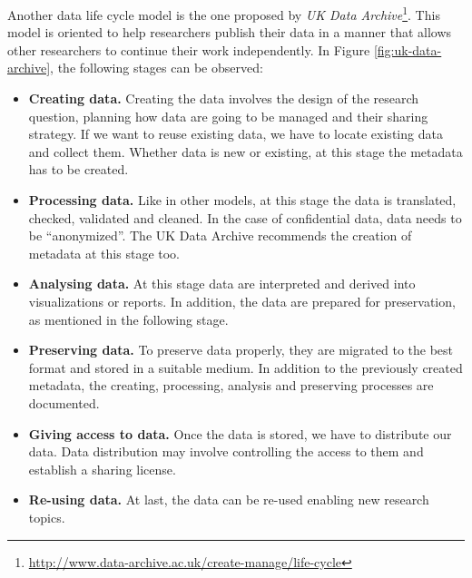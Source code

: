 Another data life cycle model is the one proposed by \textit{UK Data Archive}\footnote{\url{http://www.data-archive.ac.uk/create-manage/life-cycle}}. This model is oriented to help researchers publish their data in a manner that allows other researchers to continue their work independently. In Figure \ref{fig:uk-data-archive}, the following stages can be observed:
\begin{itemize}
    \item \textbf{Creating data.} Creating the data involves the design of the research question, planning how data are going to be managed and their sharing strategy. If we want to reuse existing data, we have to locate existing data and collect them. Whether data is new or existing, at this stage the metadata has to be created.
    \item \textbf{Processing data.} Like in other models, at this stage the data is translated, checked, validated and cleaned. In the case of confidential data, data needs to be ``anonymized''. The UK Data Archive recommends the creation of metadata at this stage too.
    \item \textbf{Analysing data.} At this stage data are interpreted and derived into visualizations or reports. In addition, the data are prepared for preservation, as mentioned in the following stage.
    \item \textbf{Preserving data.} To preserve data properly, they are migrated to the best format and stored in a suitable medium. In addition to the previously created metadata, the creating, processing, analysis and preserving processes are documented.
    \item \textbf{Giving access to data.} Once the data is stored, we have to distribute our data. Data distribution may involve controlling the access to them and establish a sharing license.
    \item \textbf{Re-using data.} At last, the data can be re-used enabling new research topics.
\end{itemize}

